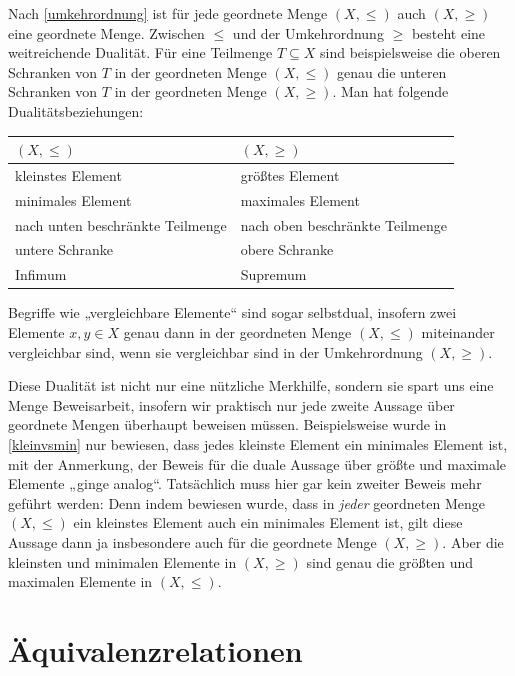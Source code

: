 \begin{bem} \label{ordnungsdualitaet} 
    Nach \cref{umkehrordnung} ist für jede geordnete Menge $(X,\le)$ auch $(X,\ge)$ eine geordnete Menge. Zwischen $\le$ und der Umkehrordnung $\ge$ besteht eine weitreichende Dualität. Für eine Teilmenge $T\subseteq X$ sind beispielsweise die oberen Schranken von $T$ in der geordneten Menge $(X,\le)$ genau die unteren Schranken von $T$ in der geordneten Menge $(X,\ge)$. Man hat folgende Dualitätsbeziehungen:
    \begin{center}
    \begin{tabular}{ll}
        $(X,\le)$ & $(X,\ge)$ \\
        \midrule
        kleinstes Element & größtes Element \\
        minimales Element & maximales Element \\
        nach unten beschränkte Teilmenge & nach oben beschränkte Teilmenge \\
        untere Schranke & obere Schranke \\
        Infimum & Supremum
    \end{tabular}
    \end{center}
    Begriffe wie „vergleichbare Elemente“ sind sogar selbstdual, insofern zwei Elemente $x,y\in X$ genau dann in der geordneten Menge $(X,\le)$ miteinander vergleichbar sind, wenn sie vergleichbar sind in der Umkehrordnung $(X,\ge)$.

    Diese Dualität ist nicht nur eine nützliche Merkhilfe, sondern sie spart uns eine Menge Beweisarbeit, insofern wir praktisch nur jede zweite Aussage über geordnete Mengen überhaupt beweisen müssen. Beispielsweise wurde in \cref{kleinvsmin} nur bewiesen, dass jedes kleinste Element ein minimales Element ist, mit der Anmerkung, der Beweis für die duale Aussage über größte und maximale Elemente „ginge analog“. Tatsächlich muss hier gar kein zweiter Beweis mehr geführt werden: Denn indem bewiesen wurde, dass in \emph{jeder} geordneten Menge $(X,\le)$ ein kleinstes Element auch ein minimales Element ist, gilt diese Aussage dann ja insbesondere auch für die geordnete Menge $(X,\ge)$. Aber die kleinsten und minimalen Elemente in $(X,\ge)$ sind genau die größten und maximalen Elemente in $(X,\le)$.
\end{bem}





\section{Äquivalenzrelationen} \label{sec:aequirel}


